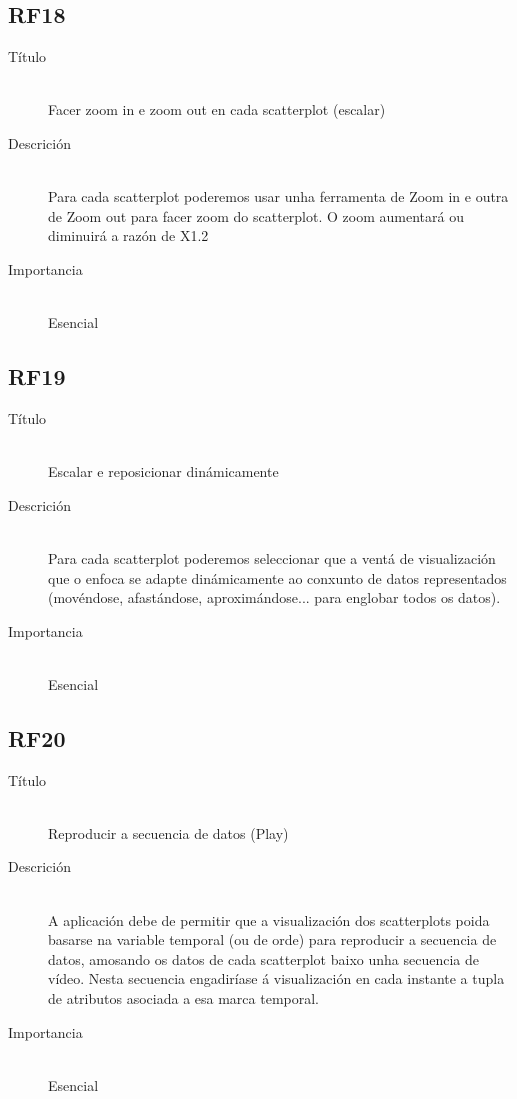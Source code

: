 \subsection*{RF18}
\begin{description}
\item[Título] \hfill \\
Facer zoom in e zoom out en cada scatterplot (escalar)
\item[Descrición] \hfill \\
Para cada scatterplot poderemos usar unha ferramenta de Zoom in e outra de Zoom out para facer zoom do scatterplot. O zoom aumentará ou diminuirá a razón de X1.2
\item[Importancia] \hfill \\
Esencial
\end{description}

\subsection*{RF19}
\begin{description}
\item[Título] \hfill \\
Escalar e reposicionar dinámicamente
\item[Descrición] \hfill \\
Para cada scatterplot poderemos seleccionar que a ventá de visualización que o enfoca se adapte dinámicamente ao conxunto de datos representados (movéndose, afastándose, aproximándose... para englobar todos os datos).
\item[Importancia] \hfill \\
Esencial
\end{description}

\subsection*{RF20}
\begin{description}
\item[Título] \hfill \\
Reproducir a secuencia de datos (Play)
\item[Descrición] \hfill \\
A aplicación debe de permitir que a visualización dos scatterplots poida basarse na variable temporal (ou de orde) para reproducir a secuencia de datos, amosando os datos de cada scatterplot baixo unha secuencia de vídeo. Nesta secuencia engadiríase á visualización en cada instante a tupla de atributos asociada a esa marca temporal. 
\item[Importancia] \hfill \\
Esencial
\end{description}

